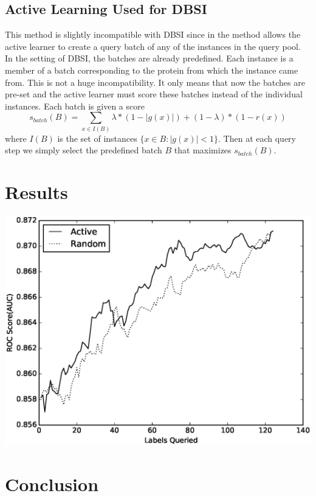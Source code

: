 \documentclass{article}
\begin{document}
\subsection*{Active Learning Used for DBSI}
This method is slightly incompatible with DBSI since in \cite{active_learning} the method allows the active learner to create a query batch of any of the instances in the query pool. In the setting of DBSI, the batches are already predefined. Each instance is a member of a batch corresponding to the protein from which the instance came from. This is not a huge incompatibility. It only means that now the batches are pre-set and the active learner must score these batches instead of the individual instances. Each batch is given a score
\[
s_{batch}(B) = \sum_{x \in I(B)} \lambda * (1- |g(x)|) + (1-\lambda) * (1 - r(x))
\]
where $I(B)$ is the set of instances $\{x \in B : |g(x)| < 1\}$. Then at each query step we simply select the predefined batch $B$ that maximizes $s_{batch}(B)$.










  






\cite{active_learning}
\section*{Results}
\includegraphics[scale=0.5]{plot}
\section*{Conclusion}


{}
\end{document}
